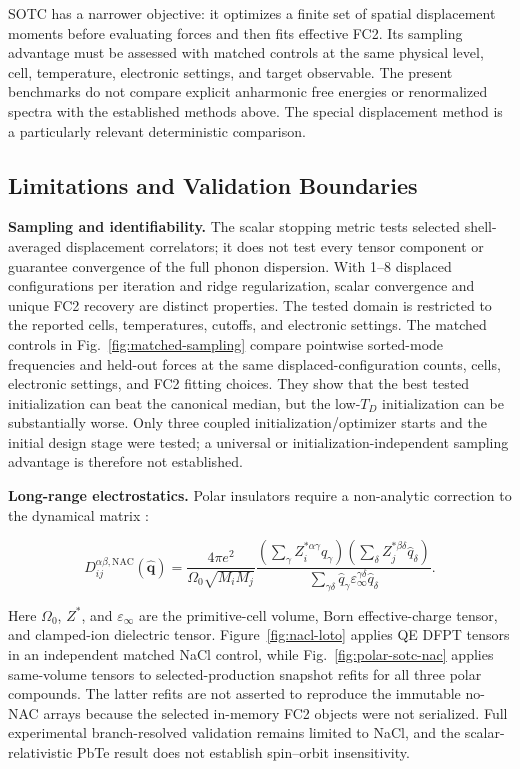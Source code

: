 \documentclass[aps,prb,reprint,amsmath,amssymb,floatfix]{revtex4-2}
\begin{document}
SOTC has a narrower objective: it optimizes a finite set of spatial displacement
moments before evaluating forces and then fits effective FC2. Its sampling
advantage must be assessed with matched controls at the same physical level,
cell, temperature, electronic settings, and target observable. The present
benchmarks do not compare explicit anharmonic free energies or renormalized
spectra with the established methods above. The special displacement method
\cite{ref42} is a particularly relevant deterministic comparison.

\subsection{Limitations and Validation Boundaries}\label{limitations-and-validation-boundaries}

\textbf{Sampling and identifiability.} The scalar stopping metric tests selected
shell-averaged displacement correlators; it does not test every tensor component
or guarantee convergence of the full phonon dispersion. With 1--8 displaced
configurations per iteration and ridge regularization, scalar convergence and
unique FC2 recovery are distinct properties. The tested domain is restricted
to the reported cells, temperatures, cutoffs, and electronic settings.
The matched controls in Fig.~\ref{fig:matched-sampling} compare pointwise
sorted-mode frequencies and held-out forces at the same displaced-configuration
counts, cells, electronic settings, and FC2 fitting choices. They show that the
best tested initialization can beat the canonical median, but the low-\(T_D\)
initialization can be substantially worse. Only three coupled
initialization/optimizer starts and the initial design stage were tested; a
universal or initialization-independent sampling advantage is therefore not
established.

\textbf{Long-range electrostatics.} Polar insulators require a non-analytic
correction to the dynamical matrix \cite{ref39}:

\begin{equation*}
D_{ij}^{\alpha\beta,\text{NAC}}(\hat{\mathbf{q}}) = \frac{4\pi e^2}{\Omega_0\sqrt{M_iM_j}} \frac{(\sum_\gamma Z_i^{*\alpha\gamma}\hat{q}_\gamma)(\sum_\delta Z_j^{*\beta\delta}\hat{q}_\delta)}{\sum_{\gamma\delta}\hat{q}_\gamma\varepsilon_\infty^{\gamma\delta}\hat{q}_\delta}.
\end{equation*}

Here \(\Omega_0\), \(Z^*\), and \(\varepsilon_\infty\) are the primitive-cell
volume, Born effective-charge tensor, and clamped-ion dielectric tensor.
Figure~\ref{fig:nacl-loto} applies QE DFPT tensors in an independent matched
NaCl control, while Fig.~\ref{fig:polar-sotc-nac} applies same-volume tensors to
selected-production snapshot refits for all three polar compounds. The latter
refits are not asserted to reproduce the immutable no-NAC arrays because the
selected in-memory FC2 objects were not serialized. Full experimental
branch-resolved validation remains limited to NaCl, and the scalar-relativistic
PbTe result does not establish spin--orbit insensitivity.
\end{document}
